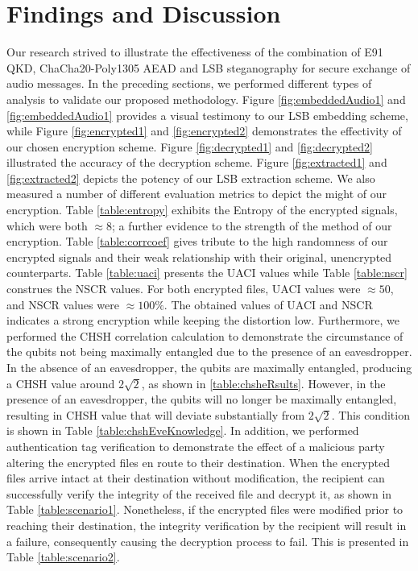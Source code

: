 \documentclass{article}
\begin{document}
\section{Findings and Discussion}
\label{sec:discussion}
Our research strived to illustrate the effectiveness of the combination of E91 QKD, ChaCha20-Poly1305 AEAD and LSB steganography for secure exchange of audio messages. In the preceding sections, we performed different types of analysis to validate our proposed methodology. Figure \ref{fig:embeddedAudio1} and \ref{fig:embeddedAudio1} provides a visual testimony to our LSB embedding scheme, while Figure \ref{fig:encrypted1} and \ref{fig:encrypted2} demonstrates the effectivity of our chosen encryption scheme. Figure \ref{fig:decrypted1} and \ref{fig:decrypted2} illustrated the accuracy of the decryption scheme. Figure \ref{fig:extracted1} and \ref{fig:extracted2} depicts the potency of our LSB extraction scheme. We also measured a number of different evaluation metrics to depict the might of our encryption. Table \ref{table:entropy} exhibits the Entropy of the encrypted signals, which were both $\approx8$; a further evidence to the strength of the method of our encryption. Table \ref{table:corrcoef} gives tribute to the high randomness of our encrypted signals and their weak relationship with their original, unencrypted counterparts. Table \ref{table:uaci} presents the UACI values while Table \ref{table:nscr} construes the NSCR values. For both encrypted files, UACI values were $\approx50$, and NSCR values were $\approx100\%$. The obtained values of UACI and NSCR indicates a strong encryption while keeping the distortion low. Furthermore, we performed the CHSH correlation calculation to demonstrate the circumstance of the qubits not being maximally entangled due to the presence of an eavesdropper. In the absence of an eavesdropper, the qubits are maximally entangled, producing a CHSH value around $2\sqrt{2}$, as shown in \ref{table:chsheRsults}. However, in the presence of an eavesdropper, the qubits will no longer be maximally entangled, resulting in CHSH value that will deviate substantially from $2\sqrt{2}$. This condition is shown in Table \ref{table:chshEveKnowledge}. In addition, we performed authentication tag verification to demonstrate the effect of a malicious party altering the encrypted files en route to their destination. When the encrypted files arrive intact at their destination without modification, the recipient can successfully verify the integrity of the received file and decrypt it, as shown in Table \ref{table:scenario1}. Nonetheless, if the encrypted files were modified prior to reaching their destination, the integrity verification by the recipient will result in a failure, consequently causing the decryption process to fail. This is presented in Table \ref{table:scenario2}.
\end{document}
